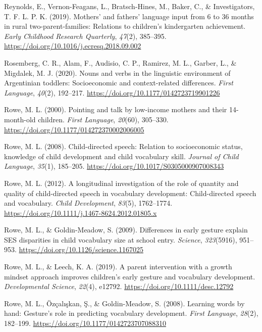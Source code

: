 \documentclass[
  english,
  man,floatsintext]{apa6}
\begin{document}
\leavevmode\hypertarget{ref-reynolds_mothers_2019}{}%
Reynolds, E., Vernon-Feagans, L., Bratsch-Hines, M., Baker, C., \& Investigators, T. F. L. P. K. (2019). Mothers' and fathers' language input from 6 to 36 months in rural two-parent-families: Relations to children's kindergarten achievement. \emph{Early Childhood Research Quarterly}, \emph{47}(2), 385--395. \url{https://doi.org/10.1016/j.ecresq.2018.09.002}

\leavevmode\hypertarget{ref-rosemberg_nouns_2020}{}%
Rosemberg, C. R., Alam, F., Audisio, C. P., Ramirez, M. L., Garber, L., \& Migdalek, M. J. (2020). Nouns and verbs in the linguistic environment of Argentinian toddlers: Socioeconomic and context-related differences. \emph{First Language}, \emph{40}(2), 192--217. \url{https://doi.org/10.1177/0142723719901226}

\leavevmode\hypertarget{ref-rowe_pointing_2000}{}%
Rowe, M. L. (2000). Pointing and talk by low-income mothers and their 14-month-old children. \emph{First Language}, \emph{20}(60), 305--330. \url{https://doi.org/10.1177/014272370002006005}

\leavevmode\hypertarget{ref-rowe_child-directed_2008}{}%
Rowe, M. L. (2008). Child-directed speech: Relation to socioeconomic status, knowledge of child development and child vocabulary skill. \emph{Journal of Child Language}, \emph{35}(1), 185--205. \url{https://doi.org/10.1017/S0305000907008343}

\leavevmode\hypertarget{ref-rowe_longitudinal_2012}{}%
Rowe, M. L. (2012). A longitudinal investigation of the role of quantity and quality of child-directed speech in vocabulary development: Child-directed speech and vocabulary. \emph{Child Development}, \emph{83}(5), 1762--1774. \url{https://doi.org/10.1111/j.1467-8624.2012.01805.x}

\leavevmode\hypertarget{ref-rowe_differences_2009}{}%
Rowe, M. L., \& Goldin-Meadow, S. (2009). Differences in early gesture explain SES disparities in child vocabulary size at school entry. \emph{Science}, \emph{323}(5916), 951--953. \url{https://doi.org/10.1126/science.1167025}

\leavevmode\hypertarget{ref-rowe_parent_2019}{}%
Rowe, M. L., \& Leech, K. A. (2019). A parent intervention with a growth mindset approach improves children's early gesture and vocabulary development. \emph{Developmental Science}, \emph{22}(4), e12792. \url{https://doi.org/10.1111/desc.12792}

\leavevmode\hypertarget{ref-rowe_learning_2008}{}%
Rowe, M. L., Özçalışkan, Ş., \& Goldin-Meadow, S. (2008). Learning words by hand: Gesture's role in predicting vocabulary development. \emph{First Language}, \emph{28}(2), 182--199. \url{https://doi.org/10.1177/0142723707088310}
\end{document}
